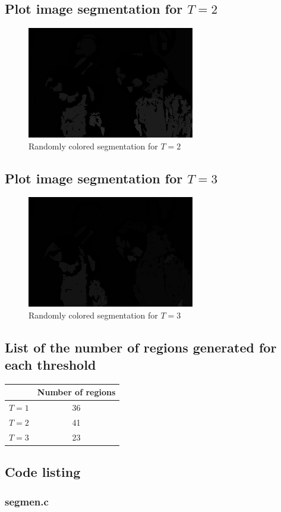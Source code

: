 \documentclass{article}
\begin{document}
\subsection{Plot image segmentation for $T=2$}
	\begin{figure}[h]
		\begin{center}
			\includegraphics[width=0.65\textwidth]{img22gd2_sm2.png}
			\caption{Randomly colored segmentation for $T=2$}
		\end{center}
	\end{figure}

\subsection{Plot image segmentation for $T=3$}
	\begin{figure}[h]
		\begin{center}
			\includegraphics[width=0.65\textwidth]{img22gd2_sm3.png}
			\caption{Randomly colored segmentation for $T=3$}
		\end{center}
	\end{figure}

\subsection{List of the number of regions generated for each threshold}
	\begin{center}
		\begin{tabular}{| l | c |}
		\hline
		& Number of regions \\ \hline
		$T=1$ & 36 \\ \hline
		$T=2$ & 41 \\ \hline
		$T=3$ & 23 \\ \hline
		\end{tabular}
	\end{center}

\subsection{Code listing}
	\subsubsection{segmen.c}
		\inputminted[tabsize=4,breaklines]{c}{segmen.c}
\end{document}
